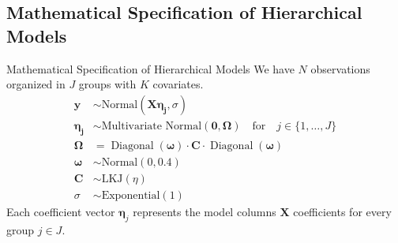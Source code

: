 \subsection{Mathematical Specification of Hierarchical Models}
\begin{frame}{Mathematical Specification of Hierarchical Models}
	We have $N$ observations organized in $J$ groups with $K$ covariates.
	$$
		\begin{aligned}
			\mathbf{y}          & \sim \text{Normal}(\mathbf{X} \boldsymbol{\eta_{j}}, \sigma)                                                       \\
			\boldsymbol{\eta_j} & \sim \text{Multivariate Normal}(\mathbf{0}, \boldsymbol{\Omega})
			\quad \text{for}\quad j \in \{ 1, \dots, J \}                                                                                            \\
			\boldsymbol{\Omega} & = \operatorname{Diagonal}(\boldsymbol{\omega}) \cdot \mathbf{C} \cdot \operatorname{Diagonal}(\boldsymbol{\omega}) \\
			\boldsymbol{\omega} & \sim \text{Normal}(0, 0.4)                                                                                         \\
			\mathbf{C}          & \sim \text{LKJ}(\eta)                                                                                              \\
			\sigma              & \sim \text{Exponential}(1)
		\end{aligned}
	$$
	Each coefficient vector $\boldsymbol{\eta}_j$ represents the
	model columns $\mathbf{X}$ coefficients for every group $j \in J$.
\end{frame}

